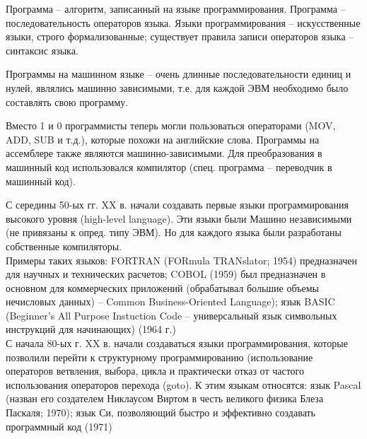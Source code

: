 Программа – алгоритм, записанный на языке программирования. Программа – последовательность операторов языка. Языки программирования – искусственные языки, строго формализованные; существует правила записи операторов языка – синтаксис языка. \\


Программы на машинном языке – очень длинные последовательности единиц и нулей, являлись машинно зависимыми, т.е. для каждой ЭВМ необходимо было составлять свою программу. \\


Вместо 1 и 0 программисты теперь могли пользоваться операторами (MOV, ADD, SUB и т.д.), которые похожи на английские слова. Программы на ассемблере также являются машинно-зависимыми. Для преобразования в машинный код использовался компилятор (спец. программа – переводчик в машинный код). \\


С середины 50-ых гг. XX в. начали создавать первые языки программирования высокого уровня (high-level language). Эти языки были Машино независимыми (не привязаны к опред. типу ЭВМ). Но для каждого языка были разработаны собственные компиляторы. \\

Примеры таких языков: FORTRAN (FORmula TRANslator; 1954) предназначен для научных и технических расчетов; COBOL (1959) был предназначен в основном для коммерческих приложений (обрабатывал большие объемы нечисловых данных) – Common Business-Oriented Language); язык BASIC (Beginner’s All Purpose Instuction Code – универсальный язык символьных инструкций для начинающих) (1964 г.) \\

С начала 80-ых г. XX в. начали создаваться языки программирования, которые позволили перейти к структурному программированию (использование операторов ветвления, выбора, цикла и практически отказ от частого использования операторов перехода (goto). К этим языкам относятся: язык Pascal (назван его создателем Никлаусом Виртом в честь великого физика Блеза Паскаля; 1970); язык Си, позволяющий быстро и эффективно создавать программный код (1971) \\

